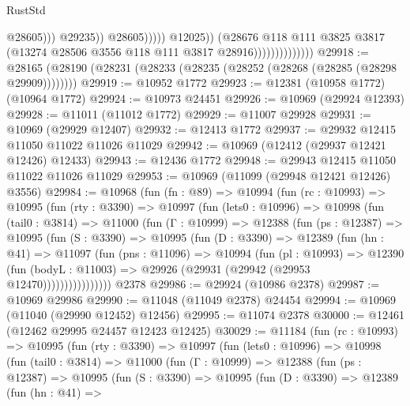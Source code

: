 \begin{lexlean}{RustStd}
\begin{coremodule}
                                                    @28605)))
                                              @29235))
                                          @28605)))))
                                @12025))
                            (@28676
                              @118
                              @111
                              @3825
                              @3817
                              (@13274 @28506 @3556 @118 @111 @3817 @28916))))))))))))))
@29918 := @28165 (@28190 (@28231 (@28233 (@28235 (@28252 (@28268 (@28285 (@28298 @29909))))))))
@29919 := @10952 @1772
@29923 := @12381 (@10958 @1772) (@10964 @1772)
@29924 := @10973 @24451
@29926 := @10969 (@29924 @12393)
@29928 := @11011 (@11012 @1772)
@29929 := @11007 @29928
@29931 := @10969 (@29929 @12407)
@29932 := @12413 @1772
@29937 := @29932 @12415 @11050 @11022 @11026 @11029
@29942 := @10969 (@12412 (@29937 @12421 @12426) @12433)
@29943 := @12436 @1772
@29948 := @29943 @12415 @11050 @11022 @11026 @11029
@29953 := @10969 (@11099 (@29948 @12421 @12426) @3556)
@29984 := @10968
    (fun (fn : @89) =>
    @10994
      (fun (rc : @10993) =>
      @10995
        (fun (rty : @3390) =>
        @10997
          (fun (lets0 : @10996) =>
          @10998
            (fun (tail0 : @3814) =>
            @11000
              (fun (Γ : @10999) =>
              @12388
                (fun (ps : @12387) =>
                @10995
                  (fun (S : @3390) =>
                  @10995
                    (fun (D : @3390) =>
                    @12389
                      (fun (hn : @41) =>
                      @11097
                        (fun (pns : @11096) =>
                        @10994
                          (fun (pl : @10993) =>
                          @12390
                            (fun (bodyL : @11003) =>
                            @29926 (@29931 (@29942 (@29953 @12470))))))))))))))))
    @2378
@29986 := @29924 (@10986 @2378)
@29987 := @10969 @29986
@29990 := @11048 (@11049 @2378) @24454
@29994 := @10969 (@11040 (@29990 @12452) @12456)
@29995 := @11074 @2378
@30000 := @12461 (@12462 @29995 @24457 @12423 @12425)
@30029 := @11184
    (fun (rc : @10993) =>
    @10995
      (fun (rty : @3390) =>
      @10997
        (fun (lets0 : @10996) =>
        @10998
          (fun (tail0 : @3814) =>
          @11000
            (fun (Γ : @10999) =>
            @12388
              (fun (ps : @12387) =>
              @10995
                (fun (S : @3390) =>
                @10995
                  (fun (D : @3390) =>
                  @12389
                    (fun (hn : @41) =>

\end{coremodule}
\end{lexlean}
